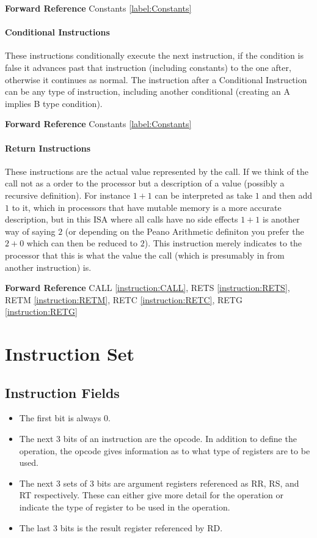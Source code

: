 \documentclass[12pt,letterpaper]{report}
\newcommand{\SEE}{\textbf{Forward Reference} }
\newcommand{\fref}[2]{#2 \ref{#1:#2}}
\begin{document}
\SEE \fref{label}{Constants}
\subsubsection{Conditional Instructions}
These instructions conditionally execute the next instruction, if the condition is false it advances past that instruction (including constants) to the one after, otherwise it continues as normal. The instruction after a Conditional Instruction can be any type of instruction, including another conditional (creating an A implies B type condition).

\SEE \fref{label}{Constants}
\subsubsection{Return Instructions}
These instructions are the actual value represented by the call. If we think of the call not as a order to the processor but a description of a value (possibly a recursive definition). For instance $1 + 1$ can be interpreted as take $1$ and then add $1$ to it, which in processors that have mutable memory is a more accurate description, but in this ISA where all calls have no side effects $1 + 1$ is another way of saying $2$ (or depending on the Peano Arithmetic definiton you prefer the $2 + 0$ which can then be reduced to $2$). This instruction merely indicates to the processor that this is what the value the call (which is presumably in from another instruction) is.

\SEE \fref{instruction}{CALL}, \fref{instruction}{RETS}, \fref{instruction}{RETM}, \fref{instruction}{RETC}, \fref{instruction}{RETG}
\chapter{Instruction Set}
\section{Instruction Fields}
\label{label:Instruction Fields}
\begin{itemize}
\item The first bit is always $0$.
\item The next 3 bits of an instruction are the opcode. In addition to define the operation, the opcode gives information as to what type of registers are to be used.
\item The next 3 sets of 3 bits are argument registers referenced as RR, RS, and RT respectively. These can either give more detail for the operation or indicate the type of register to be used in the operation.
\item The last 3 bits is the result register referenced by RD.
\end{itemize}
\end{document}
